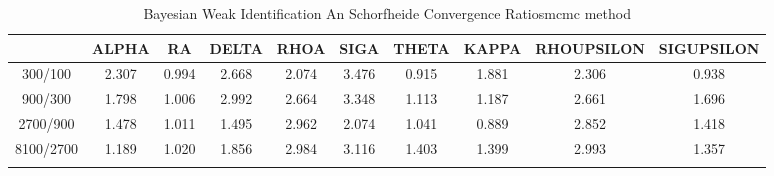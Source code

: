 \documentclass[a4paper,10pt]{article}
\begin{document}
\centering
\begin{longtable}{cccccccccc}
\toprule
 & ALPHA & RA & DELTA & RHOA & SIGA & THETA & KAPPA & RHOUPSILON & SIGUPSILON \\
\midrule
300/100 & 2.307 & 0.994 & 2.668 & 2.074 & 3.476 & 0.915 & 1.881 & 2.306 & 0.938 \\
900/300 & 1.798 & 1.006 & 2.992 & 2.664 & 3.348 & 1.113 & 1.187 & 2.661 & 1.696 \\
2700/900 & 1.478 & 1.011 & 1.495 & 2.962 & 2.074 & 1.041 & 0.889 & 2.852 & 1.418 \\
8100/2700 & 1.189 & 1.020 & 1.856 & 2.984 & 3.116 & 1.403 & 1.399 & 2.993 & 1.357 \\
\bottomrule
\caption{Bayesian Weak Identification An Schorfheide Convergence Ratiosmcmc method}
\label{table:tbl:WeakAnSchoConvergenceRatios_mcmc}
\end{longtable}
\end{document}
